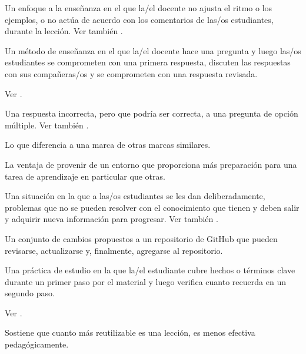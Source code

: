 \begin{description}
 Un enfoque a la enseñanza en el que la/el docente no ajusta el ritmo o los ejemplos, o no actúa de acuerdo con los comentarios de las/os estudiantes, durante la lección.  Ver también .



 Un método de enseñanza en el que la/el docente hace una pregunta y luego las/os estudiantes se comprometen con una primera respuesta, discuten las respuestas con sus compañeras/os y se comprometen con una respuesta revisada.

 Ver .


 Una respuesta incorrecta, pero que
podría ser correcta, a una pregunta de opción múltiple. Ver también
.

 Lo que diferencia a una marca de otras 
marcas similares.

 La ventaja de provenir de un entorno que proporciona más preparación para una tarea de aprendizaje en particular que otras.

 Una situación en la que a las/os estudiantes 
se les dan deliberadamente, problemas que no se pueden resolver con el conocimiento que tienen y 
deben salir y adquirir nueva información para progresar. 
Ver también .

 Un conjunto de cambios propuestos a un repositorio de 
GitHub que pueden revisarse, actualizarse y, finalmente, agregarse al repositorio.

 Una práctica de estudio 
en la que la/el estudiante cubre hechos o términos clave durante un primer paso por el material
y luego verifica cuanto recuerda en un segundo paso.

Ver .

 Sostiene que cuanto más reutilizable 
es una lección, es menos efectiva pedagógicamente.



\end{description}
